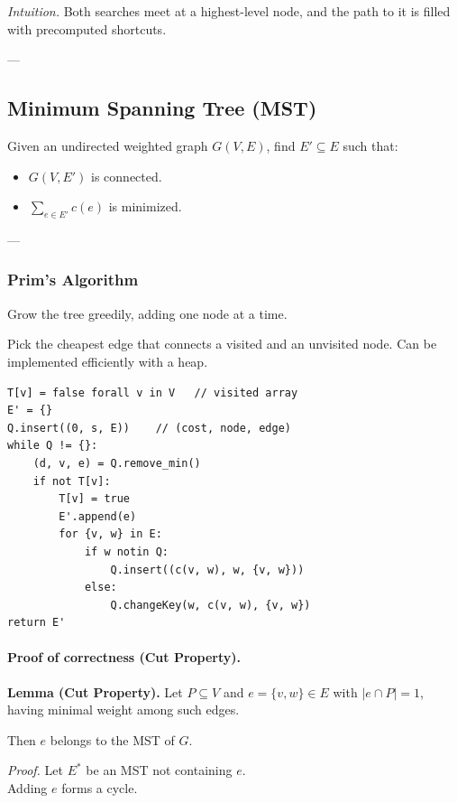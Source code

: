 \documentclass{article}
\begin{document}
\emph{Intuition.}  
Both searches meet at a highest-level node, and the path to it is filled with precomputed shortcuts.

---

\subsection{Minimum Spanning Tree (MST)}

Given an undirected weighted graph $G(V,E)$, find $E' \subseteq E$ such that:
\begin{itemize}
    \item $G(V,E')$ is connected.
    \item $\sum_{e \in E'} c(e)$ is minimized.
\end{itemize}

---

\subsubsection{Prim’s Algorithm}

Grow the tree greedily, adding one node at a time.

Pick the cheapest edge that connects a visited and an unvisited node.  
Can be implemented efficiently with a heap.

\begin{verbatim}
T[v] = false forall v in V   // visited array
E' = {}
Q.insert((0, s, E))    // (cost, node, edge)
while Q != {}:
    (d, v, e) = Q.remove_min()
    if not T[v]:
        T[v] = true
        E'.append(e)
        for {v, w} in E:
            if w notin Q:
                Q.insert((c(v, w), w, {v, w}))
            else:
                Q.changeKey(w, c(v, w), {v, w})
return E'
\end{verbatim}

\paragraph{Proof of correctness (Cut Property).}

\textbf{Lemma (Cut Property).}  
Let $P \subseteq V$ and $e = \{v,w\} \in E$ with $|e \cap P| = 1$, having minimal weight among such edges.  

Then $e$ belongs to the MST of $G$.

\emph{Proof.}  
Let $E^*$ be an MST not containing $e$.  \\

Adding $e$ forms a cycle.  \\
\end{document}
